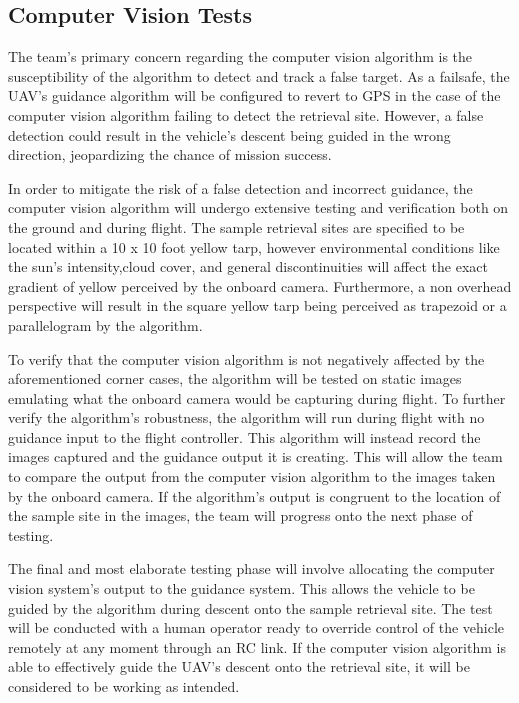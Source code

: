 	\subsection{Computer Vision Tests}
	The team’s primary concern regarding the computer vision algorithm is the susceptibility of the algorithm to detect and track  a false target. As a failsafe, the UAV’s guidance algorithm will be configured to revert to GPS in the case of the computer vision algorithm failing to detect the retrieval site. However, a false detection could result in the vehicle’s descent being guided in the wrong direction, jeopardizing the chance of mission success.

	In order to mitigate the risk of a false detection and incorrect guidance, the computer vision algorithm will undergo extensive testing and verification both on the ground and during flight. The sample retrieval sites are specified to be located within a 10 x 10 foot yellow tarp, however environmental conditions like the sun’s intensity,cloud cover, and general discontinuities will affect the exact gradient of yellow perceived by the onboard camera. Furthermore, a non overhead perspective will result in the square yellow tarp being perceived as trapezoid or a parallelogram by the algorithm.

	To verify that the computer vision algorithm is not negatively affected by the aforementioned corner cases, the algorithm will be tested on static images emulating what the onboard camera would be capturing during flight. To further verify the algorithm’s robustness, the algorithm will run  during flight with no guidance input to the flight controller. This algorithm will instead record the images captured and the guidance output it is creating. This will allow the team to compare the output from the computer vision algorithm to the images taken by the onboard camera. If the algorithm’s output is congruent to the location of the sample site in the images, the team will progress onto the next phase of testing.

	The final and most elaborate testing phase will involve allocating the computer vision system’s output to the guidance system. This allows the vehicle to be guided by the algorithm during descent onto the sample retrieval site. The test will be conducted with a human operator ready to override control of the vehicle remotely at any moment through an RC link. If the computer vision algorithm is able to effectively guide the UAV’s descent onto the retrieval site, it will be considered to be working as intended.






